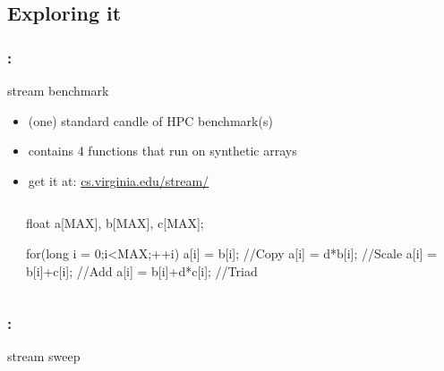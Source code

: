 \documentclass[9pt,xcolor=table]{beamer}
\begin{document}
\subsection{Exploring it}
\begin{frame}[fragile]
\frametitle{\insertsectionhead{}: \insertsubsection{}}
\begin{block}{stream benchmark \cite{McCalpin1995,McCalpin2007}}
  \begin{itemize}
  \item (one) standard candle of HPC benchmark(s)
  \item contains 4 functions that run on synthetic arrays 
  \item get it at: \href{http://www.cs.virginia.edu/stream/}{cs.virginia.edu/stream/}
  \end{itemize}
\end{block}
\begin{columns}
  \begin{column}{.17\textwidth}
    \hfill
  \end{column}
  \begin{column}{.6\textwidth}
    \begin{pyglist}[language=c++,numbers=left,style=emacs]
      float a[MAX], b[MAX], c[MAX];
  
      for(long i = 0;i<MAX;++i) { 
        a[i] = b[i]; //Copy 
        a[i] = d*b[i]; //Scale 
        a[i] = b[i]+c[i]; //Add 
        a[i] = b[i]+d*c[i]; //Triad }
    \end{pyglist}
  \end{column}
  \begin{column}{.17\textwidth}
    \hfill
  \end{column}
\end{columns}
\end{frame}

\begin{frame}
\frametitle{\insertsectionhead{}: \insertsubsection{}}
\huge
\begin{center}
  stream sweep
\end{center}
\end{frame}
\end{document}
